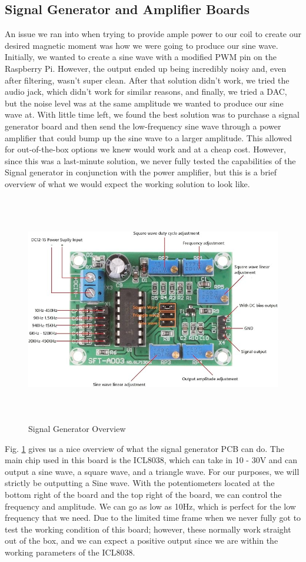 \subsection{Signal Generator and Amplifier Boards}
An issue we ran into when trying to provide ample power to our coil to create our desired magnetic moment was how we were going to produce our sine wave. Initially, we wanted to create a sine wave with a modified PWM pin on the Raspberry Pi. However, the output ended up being incredibly noisy and, even after filtering, wasn't super clean. After that solution didn't work, we tried the audio jack, which didn't work for similar reasons, and finally, we tried a DAC, but the noise level was at the same amplitude we wanted to produce our sine wave at. With little time left, we found the best solution was to purchase a signal generator board and then send the low-frequency sine wave through a power amplifier that could bump up the sine wave to a larger amplitude. This allowed for out-of-the-box options we knew would work and at a cheap cost. However, since this was a last-minute solution, we never fully tested the capabilities of the Signal generator in conjunction with the power amplifier, but this is a brief overview of what we would expect the working solution to look like.
\begin{figure}[H]
    \centering
    \includegraphics[height=10cm]{Signal Generator.jpg}
    \caption{Signal Generator Overview}
    \label{fig:Signal Generator}
\end{figure}
Fig. \ref{fig:Signal Generator} gives us a nice overview of what the signal generator PCB can do. The main chip used in this board is the ICL8038, which can take in 10 - 30V and can output a sine wave, a square wave, and a triangle wave. For our purposes, we will strictly be outputting a Sine wave. With the potentiometers located at the bottom right of the board and the top right of the board, we can control the frequency and amplitude. We can go as low as 10Hz, which is perfect for the low frequency that we need. Due to the limited time frame when we never fully got to test the working condition of this board; however, these normally work straight out of the box, and we can expect a positive output since we are within the working parameters of the ICL8038.

